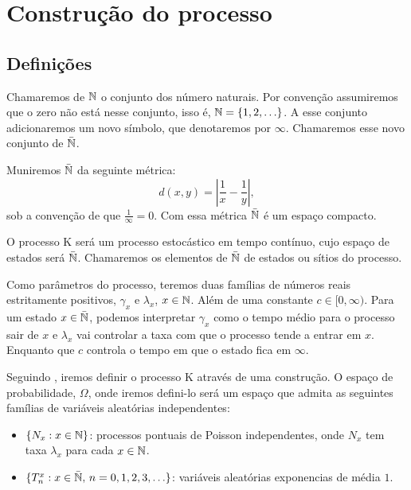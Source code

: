 \chapter{Construção do processo}
\label{cap:construcao}

\section{Definições}
\label{sec:definicoes}

Chamaremos de ${\mathbb{N}}$ o conjunto dos número naturais. Por convenção
assumiremos que o zero não está nesse conjunto, isso é, ${\mathbb{N}} = \{ 1, 2,
\ldots \}$. A esse conjunto adicionaremos um novo símbolo, que
denotaremos por $\infty$. Chamaremos esse novo conjunto de ${\bar{{\mathbb{N}}}}$.

Muniremos ${\bar{{\mathbb{N}}}}$ da seguinte métrica:
\begin{equation}
  \label{eq:metrica}
  d(x, y) = \left\lvert \frac{1}{x} - \frac{1}{y} \right\rvert,
\end{equation}
sob a convenção de que $\frac{1}{\infty} = 0$. Com essa métrica ${\bar{{\mathbb{N}}}}$
é um espaço compacto.

O processo K será um processo estocástico em tempo contínuo, cujo
espaço de estados será ${\bar{{\mathbb{N}}}}$. Chamaremos os elementos de ${\bar{{\mathbb{N}}}}$ de
estados ou sítios do processo.

Como parâmetros do processo, teremos duas famílias de números reais
estritamente positivos, $\gamma_x$ e $\lambda_x$, $x \in {\mathbb{N}}$. Além de
uma constante $c \in [0, \infty)$.  Para um estado $x \in {\bar{{\mathbb{N}}}}$,
podemos interpretar $\gamma_x$ como o tempo médio para o processo sair
de $x$ e $\lambda_x$ vai controlar a taxa com que o processo tende a
entrar em $x$. Enquanto que $c$ controla o tempo em que o estado fica
em $\infty$.

Seguindo \cite{fontes:08}, iremos definir o processo K através de uma
construção. O espaço de probabilidade, $\Omega$, onde iremos defini-lo
será um espaço que admita as seguintes famílias de variáveis
aleatórias independentes:

\begin{itemize}
\item $\{ N_x: x \in {\mathbb{N}} \}$: processos pontuais de Poisson
  independentes, onde $N_x$ tem taxa $\lambda_x$ para cada $x \in {\mathbb{N}}$.
\item $\{T_n^x: x \in {\bar{{\mathbb{N}}}} , \, n = 0, 1, 2, 3, \ldots \}$: variáveis
  aleatórias exponencias de média $1$.
\end{itemize}

